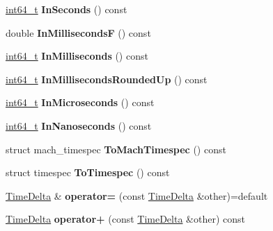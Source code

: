 \begin{DoxyCompactItemize}
\mbox{\hyperlink{classint64__t}{int64\+\_\+t}} {\bfseries In\+Seconds} () const
\item 
\mbox{\label{classv8_1_1base_1_1TimeDelta_a494cc64764a7ba009367e2e8b64496de}} 
double {\bfseries In\+MillisecondsF} () const
\item 
\mbox{\label{classv8_1_1base_1_1TimeDelta_a9c8eb8673ef889573d506dcca50916b0}} 
\mbox{\hyperlink{classint64__t}{int64\+\_\+t}} {\bfseries In\+Milliseconds} () const
\item 
\mbox{\label{classv8_1_1base_1_1TimeDelta_a1c1dda4c68538b3639d1aba67a7a8de2}} 
\mbox{\hyperlink{classint64__t}{int64\+\_\+t}} {\bfseries In\+Milliseconds\+Rounded\+Up} () const
\item 
\mbox{\label{classv8_1_1base_1_1TimeDelta_ad9006b332aa15e66f2ddb8e8ba910892}} 
\mbox{\hyperlink{classint64__t}{int64\+\_\+t}} {\bfseries In\+Microseconds} () const
\item 
\mbox{\label{classv8_1_1base_1_1TimeDelta_aefed1ef54ddd4ef360b422cfbcc7785b}} 
\mbox{\hyperlink{classint64__t}{int64\+\_\+t}} {\bfseries In\+Nanoseconds} () const
\item 
\mbox{\label{classv8_1_1base_1_1TimeDelta_a06c9d41e9cd433f94317b66808e03521}} 
struct mach\+\_\+timespec {\bfseries To\+Mach\+Timespec} () const
\item 
\mbox{\label{classv8_1_1base_1_1TimeDelta_a966a8dfea07271a6d811f39b7eac83a8}} 
struct timespec {\bfseries To\+Timespec} () const
\item 
\mbox{\label{classv8_1_1base_1_1TimeDelta_a52d54cfdb429bcfaa1dc4a5862ed01d5}} 
\mbox{\hyperlink{classv8_1_1base_1_1TimeDelta}{Time\+Delta}} \& {\bfseries operator=} (const \mbox{\hyperlink{classv8_1_1base_1_1TimeDelta}{Time\+Delta}} \&other)=default
\item 
\mbox{\label{classv8_1_1base_1_1TimeDelta_a7baee0421cee5d71bba6a71cb886a243}} 
\mbox{\hyperlink{classv8_1_1base_1_1TimeDelta}{Time\+Delta}} {\bfseries operator+} (const \mbox{\hyperlink{classv8_1_1base_1_1TimeDelta}{Time\+Delta}} \&other) const

\end{DoxyCompactItemize}
